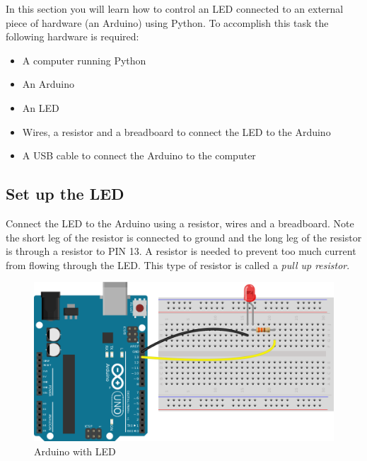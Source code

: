\documentclass{book}
\makeatletter
\def\maxwidth{\ifdim\Gin@nat@width>\linewidth\linewidth
    \else\Gin@nat@width\fi}
\let\Oldincludegraphics\includegraphics
\renewcommand{\includegraphics}[1]{\Oldincludegraphics[width=.8\maxwidth]{#1}}
\providecommand{\tightlist}{%
      \setlength{\itemsep}{0pt}\setlength{\parskip}{0pt}}
\makeatother
\begin{document}
    
        In this section you will learn how to control an LED connected to an
external piece of hardware (an Arduino) using Python. To accomplish this
task the following hardware is required:

\begin{itemize}
\tightlist
\item
  A computer running Python
\item
  An Arduino
\item
  An LED
\item
  Wires, a resistor and a breadboard to connect the LED to the Arduino
\item
  A USB cable to connect the Arduino to the computer
\end{itemize}
    




    
        \subsection{Set up the LED}\label{set-up-the-led}
    




    
        Connect the LED to the Arduino using a resistor, wires and a breadboard.
Note the short leg of the resistor is connected to ground and the long
leg of the resistor is through a resistor to PIN 13. A resistor is
needed to prevent too much current from flowing through the LED. This
type of resistor is called a \emph{pull up resistor}.
    




    
        \begin{figure}
\centering
\includegraphics{images/arduino_LED.png}
\caption{Arduino with LED}
\end{figure}
    
\end{document}
